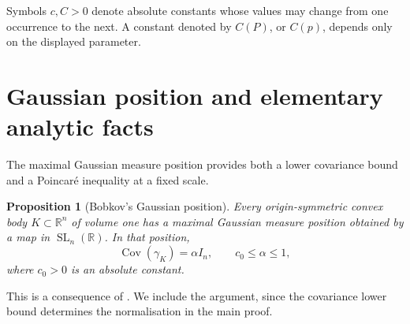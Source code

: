 \documentclass[11pt]{amsart}
\numberwithin{equation}{section}
\newtheorem{proposition}[theorem]{Proposition}
\theoremstyle{definition}
\theoremstyle{remark}
\newcommand{\R}{\mathbb R}
\newcommand{\Id}{I_n}
\DeclareMathOperator{\Cov}{Cov}
\DeclareMathOperator{\SL}{SL}
\begin{document}
Symbols \(c,C>0\) denote absolute constants whose values may change from
one occurrence to the next. A constant denoted by \(C(P)\), or \(C(p)\),
depends only on the displayed parameter.

\section{Gaussian position and elementary analytic facts}
\label{sec:gaussian-position}

The maximal Gaussian measure position provides both a lower covariance
bound and a Poincar\'e inequality at a fixed scale.

\begin{proposition}[Bobkov's Gaussian position]\label{prop:gaussian-position}
Every origin-symmetric convex body \(K\subset\R^n\) of volume one has a
maximal Gaussian measure position obtained by a map in \(\SL_n(\R)\).
In that position,
\begin{equation}\label{eq:alpha-covariance}
\Cov(\gamma_K)=\alpha\Id,
\qquad c_0\le\alpha\le1,
\end{equation}
where \(c_0>0\) is an absolute constant.
\end{proposition}

This is a consequence of \cite[Proposition~3.1 and Lemma~4.1]{Bob11}.
We include the argument, since the covariance lower bound determines the
normalisation in the main proof.
\end{document}
